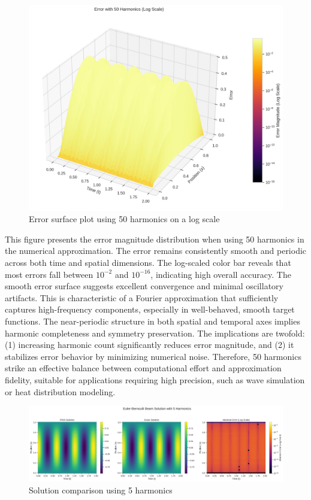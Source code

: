 \documentclass[preprint,12pt]{elsarticle}
\begin{document}
\begin{figure}[t]
    \centering
    \includegraphics[width=0.9\linewidth]{figures/3d_comparison_error_50h.png}
    \caption{Error surface plot using 50 harmonics on a log scale}
    \label{fig:error_50h}
\end{figure}

This figure presents the error magnitude distribution when using 50 harmonics in the numerical approximation. The error remains consistently smooth and periodic across both time and spatial dimensions. The log-scaled color bar reveals that most errors fall between \(10^{-2}\) and \(10^{-16}\), indicating high overall accuracy. The smooth error surface suggests excellent convergence and minimal oscillatory artifacts. This is characteristic of a Fourier approximation that sufficiently captures high-frequency components, especially in well-behaved, smooth target functions. The near-periodic structure in both spatial and temporal axes implies harmonic completeness and symmetry preservation. The implications are twofold: (1) increasing harmonic count significantly reduces error magnitude, and (2) it stabilizes error behavior by minimizing numerical noise. Therefore, 50 harmonics strike an effective balance between computational effort and approximation fidelity, suitable for applications requiring high precision, such as wave simulation or heat distribution modeling.

\begin{figure}[t]
    \centering
    \includegraphics[width=0.9\linewidth]{figures/comparison_5h.png}
    \caption{Solution comparison using 5 harmonics}
    \label{fig:beam_5h}
\end{figure}
\end{document}
